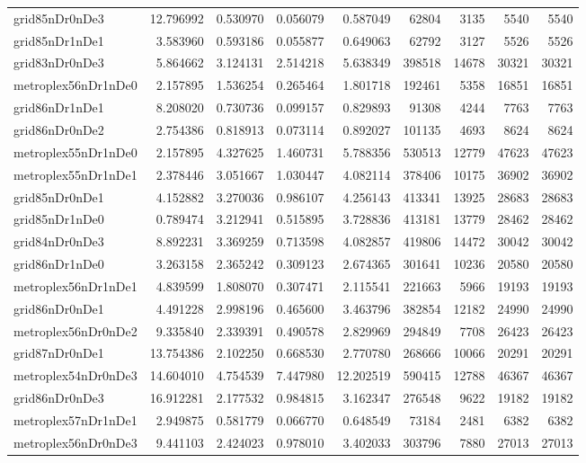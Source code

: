 \begin{longtable}{|l|r|r|r|r|r|r|r|r|}
grid85nDr0nDe3 & 12.796992 & 0.530970 & 0.056079 & 0.587049 & 62804 & 3135 & 5540 & 5540 \\
grid85nDr1nDe1 & 3.583960 & 0.593186 & 0.055877 & 0.649063 & 62792 & 3127 & 5526 & 5526 \\
grid83nDr0nDe3 & 5.864662 & 3.124131 & 2.514218 & 5.638349 & 398518 & 14678 & 30321 & 30321 \\
metroplex56nDr1nDe0 & 2.157895 & 1.536254 & 0.265464 & 1.801718 & 192461 & 5358 & 16851 & 16851 \\
grid86nDr1nDe1 & 8.208020 & 0.730736 & 0.099157 & 0.829893 & 91308 & 4244 & 7763 & 7763 \\
grid86nDr0nDe2 & 2.754386 & 0.818913 & 0.073114 & 0.892027 & 101135 & 4693 & 8624 & 8624 \\
metroplex55nDr1nDe0 & 2.157895 & 4.327625 & 1.460731 & 5.788356 & 530513 & 12779 & 47623 & 47623 \\
metroplex55nDr1nDe1 & 2.378446 & 3.051667 & 1.030447 & 4.082114 & 378406 & 10175 & 36902 & 36902 \\
grid85nDr0nDe1 & 4.152882 & 3.270036 & 0.986107 & 4.256143 & 413341 & 13925 & 28683 & 28683 \\
grid85nDr1nDe0 & 0.789474 & 3.212941 & 0.515895 & 3.728836 & 413181 & 13779 & 28462 & 28462 \\
grid84nDr0nDe3 & 8.892231 & 3.369259 & 0.713598 & 4.082857 & 419806 & 14472 & 30042 & 30042 \\
grid86nDr1nDe0 & 3.263158 & 2.365242 & 0.309123 & 2.674365 & 301641 & 10236 & 20580 & 20580 \\
metroplex56nDr1nDe1 & 4.839599 & 1.808070 & 0.307471 & 2.115541 & 221663 & 5966 & 19193 & 19193 \\
grid86nDr0nDe1 & 4.491228 & 2.998196 & 0.465600 & 3.463796 & 382854 & 12182 & 24990 & 24990 \\
metroplex56nDr0nDe2 & 9.335840 & 2.339391 & 0.490578 & 2.829969 & 294849 & 7708 & 26423 & 26423 \\
grid87nDr0nDe1 & 13.754386 & 2.102250 & 0.668530 & 2.770780 & 268666 & 10066 & 20291 & 20291 \\
metroplex54nDr0nDe3 & 14.604010 & 4.754539 & 7.447980 & 12.202519 & 590415 & 12788 & 46367 & 46367 \\
grid86nDr0nDe3 & 16.912281 & 2.177532 & 0.984815 & 3.162347 & 276548 & 9622 & 19182 & 19182 \\
metroplex57nDr1nDe1 & 2.949875 & 0.581779 & 0.066770 & 0.648549 & 73184 & 2481 & 6382 & 6382 \\
metroplex56nDr0nDe3 & 9.441103 & 2.424023 & 0.978010 & 3.402033 & 303796 & 7880 & 27013 & 27013 \\

\end{longtable}

